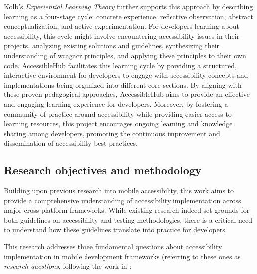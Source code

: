 Kolb's \textit{Experiential Learning Theory} \cite{kolb1984experiential} further supports this approach by describing learning as a four-stage cycle: concrete experience, reflective observation, abstract conceptualization, and active experimentation. For developers learning about accessibility, this cycle might involve encountering accessibility issues in their projects, analyzing existing solutions and guidelines, synthesizing their understanding of \acrshort{wcagacr} principles, and applying these principles to their own code. AccessibleHub facilitates this learning cycle by providing a structured, interactive environment for developers to engage with accessibility concepts and implementations being organized into different core sections. By aligning with these proven pedagogical approaches, AccessibleHub aims to provide an effective and engaging learning experience for developers. Moreover, by fostering a community of practice around accessibility while providing easier access to learning resources, this project encourages ongoing learning and knowledge sharing among developers, promoting the continuous improvement and dissemination of accessibility best practices.

\subsection{Research objectives and methodology}

Building upon previous research into mobile accessibility, this work aims to provide a comprehensive understanding of accessibility implementation across major cross-platform frameworks. While existing research indeed set grounds for both guidelines on accessibility and testing methodologies, there is a critical need to understand how these guidelines translate into practice for developers. 

This research addresses three fundamental questions about accessibility implementation in mobile development frameworks (referring to these ones as \textit{research questions}, following the work in \cite{perinello2024accessibility}:

